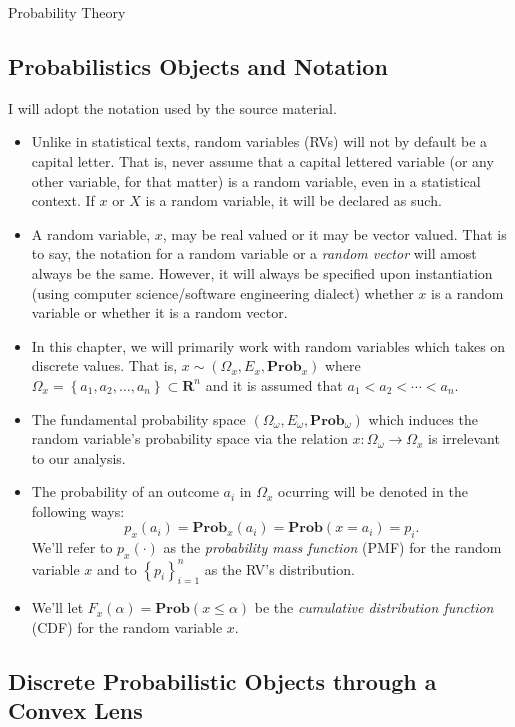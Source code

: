 \begin{chapter}{Probability Theory}
    \subsection{Probabilistics Objects and Notation}
    I will adopt the notation used by the source material. %
    \begin{itemize}
        \item Unlike in statistical texts, random variables (RVs) will not by default be a capital letter.
        That is, never assume that a capital lettered variable (or any other variable, for that matter) is a random variable, even in a statistical
        context. If $x$ or $X$ is a random variable, it will be declared as such.
        \item A random variable, $x$, may be real valued or it may be vector valued. That is to say, the notation for a random variable or a \textit{random vector}
        will amost always be the same. However, it will always be specified upon instantiation (using computer science/software engineering dialect) whether $x$ is a random variable or whether it
        is a random vector. 
        \item In this chapter, we will primarily work with random variables which takes on discrete values. That is,
        $x \sim (\Omega_x, E_x, \mathbf{Prob}_x)$ where $\Omega_x = \left\{ a_1, a_2, \ldots, a_n \right\} \subset \mathbf{R}^n$ and
        it is assumed that $a_1 < a_2 < \cdots < a_n$.
        \item The fundamental probability space $(\Omega_\omega, E_\omega, \mathbf{Prob}_\omega)$ which induces the random variable's
        probability space via the relation $x: \Omega_\omega \to \Omega_x$ is irrelevant to our analysis.
        \item The probability of an outcome $a_i$ in $\Omega_x$ ocurring will be denoted in the following ways:
        \[p_x(a_i) = \mathbf{Prob}_{x}\left(a_i\right) = \mathbf{Prob}\left(x = a_i\right) = p_i.\]
        We'll refer to $p_x(\cdot)$ as the \textit{probability mass function} (PMF) for the random variable $x$ and to $\left\{ p_i \right\}_{i=1}^n$ as the
        RV's distribution.
        \item We'll let $F_x(\alpha) = \mathbf{Prob}\left(x \le \alpha\right)$ be the \textit{cumulative distribution function} (CDF) for the random variable $x$.
    \end{itemize}

    \subsection{Discrete Probabilistic Objects through a Convex Lens}


\end{chapter}
